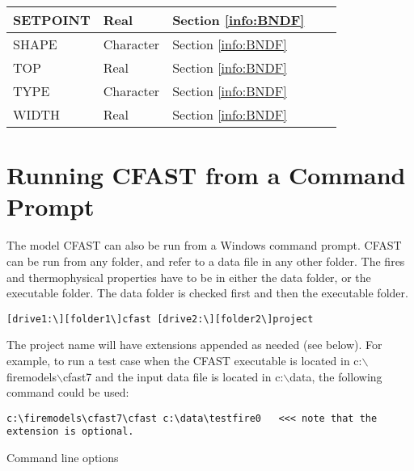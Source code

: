 \begin{longtable}{@{\extracolsep{\fill}}|l|l|l|l|l|}
{\ct SETPOINT}        & Real   & Section \ref{info:BNDF}                 &           &                 \\ \hline
{\ct SHAPE}        & Character   & Section \ref{info:BNDF}                 &           &                 \\ \hline
{\ct TOP}        & Real   & Section \ref{info:BNDF}                 &           &                 \\ \hline
{\ct TYPE}        & Character   & Section \ref{info:BNDF}                 &           &                 \\ \hline
{\ct WIDTH}        & Real   & Section \ref{info:BNDF}                 &           &                 \\ \hline
\end{longtable}

\vspace{\baselineskip}



\chapter{Running CFAST from a Command Prompt}

The model CFAST can also be run from a Windows command prompt.  CFAST can be run from any folder, and refer to a data file in any other folder. The fires and thermophysical properties have to be in either the data folder, or the executable folder. The data folder is checked first and then the executable folder.

\begin{lstlisting}
[drive1:\][folder1\]cfast [drive2:\][folder2\]project
\end{lstlisting}

The project name will have extensions appended as needed (see below). For example, to run a test case when the CFAST executable is located in c:$\backslash$firemodels$\backslash$cfast7 and the input data file is located in c:$\backslash$data, the following command could be used:

\begin{lstlisting}
c:\firemodels\cfast7\cfast c:\data\testfire0   <<< note that the extension is optional.
\end{lstlisting}

Command line options

